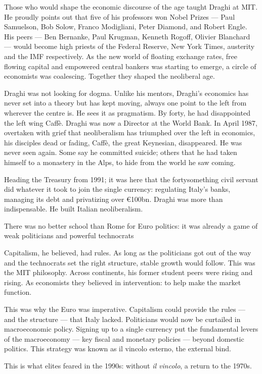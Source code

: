 \documentclass[
]{book}
\begin{document}
Those who would shape the economic discourse of the age taught Draghi at MIT.
He proudly points out that five of his professors won Nobel Prizes ---
Paul Samuelson, Bob Solow, Franco Modigliani, Peter Diamond, and Robert Engle.
His peers --- Ben Bernanke, Paul Krugman, Kenneth Rogoff, Olivier Blanchard ---
would become high priests of the Federal Reserve, New York Times, austerity and the IMF
respectively.
As the new world of floating exchange rates, free flowing capital and empowered
central bankers was starting to emerge, a circle of economists was coalescing.
Together they shaped the neoliberal age.

Draghi was not looking for dogma. Unlike his mentors, Draghi's economics has never set into a theory but has kept moving, always one point to the left from wherever the centre is. He sees it as pragmatism. By forty, he had disappointed the left wing Caffè. Draghi was now a Director at the World Bank. In April 1987, overtaken with grief that neoliberalism has triumphed over the left in economics, his disciples dead or fading, Caffè, the great Keynesian, disappeared. He was never seen again. Some say he committed suicide; others that he had taken himself to a monastery in the Alps, to hide from the world he saw coming.

Heading the Treasury from 1991; it was here that the fortysomething civil servant did whatever it took to join the single currency: regulating Italy's banks, managing its debt and privatizing over €100bn. Draghi was more than indispensable. He built Italian neoliberalism.

There was no better school than Rome for Euro politics: it was already a game of weak politicians and powerful technocrats

Capitalism, he believed, had rules. As long as the politicians got out of the way and the technocrats set the right structure, stable growth would follow.
This was the MIT philosophy. Across continents, his former student peers were rising and rising. As economists they believed in intervention: to help make the market function.

This was why the Euro was imperative. Capitalism could provide the rules --- and the structure --- that Italy lacked. Politicians would now be curtailed in macroeconomic policy. Signing up to a single currency put the fundamental levers of the macroeconomy --- key fiscal and monetary policies --- beyond domestic politics. This strategy was known as il vincolo esterno, the external bind.

This is what elites feared in the 1990s: without \emph{il vincolo}, a return to the 1970s.
\end{document}
